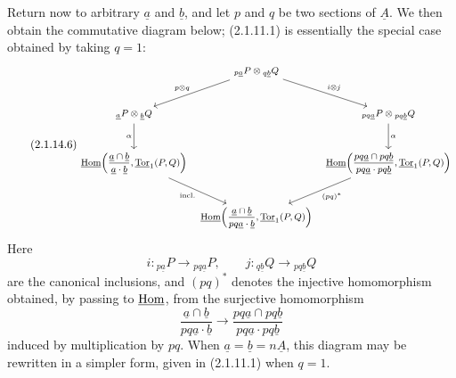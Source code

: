 Return now to arbitrary $\underline a$ and $\underline b$, and let
$p$ and $q$ be two sections of $\underline A$.  We then obtain the
commutative diagram below; (2.1.11.1) is essentially the special case
obtained by taking $q=1$:
\begin{equation}\tag{2.1.14.6}
{\footnotesize
\begin{tikzcd}[row sep=large,column sep=tiny]
 &{}_{p\underline a}P\otimes{}_{q\underline b}Q
   \arrow[dl,"p\otimes q"']
   \arrow[dr,"i\otimes j"]&\\
 {}_{\underline a}P\otimes{}_{\underline b}Q
   \arrow[d,"\alpha"']&&
 {}_{pq\underline a}P\otimes{}_{pq\underline b}Q
   \arrow[d,"\alpha"]\\
 \uHom\!\left(
   \dfrac{\underline a\cap\underline b}
         {\underline a\mathbin{\cdot}\underline b},
   \uTor_1(P,Q)
 \right)
   \arrow[dr,"\mathrm{incl.}"']&&
 \uHom\!\left(
   \dfrac{pq\underline a\cap pq\underline b}
         {pq\underline a\mathbin{\cdot}pq\underline b},
   \uTor_1(P,Q)
 \right)
   \arrow[dl,"(pq)^*"]\\
 &\uHom\!\left(
   \dfrac{\underline a\cap\underline b}
         {pq\underline a\mathbin{\cdot}\underline b},
   \uTor_1(P,Q)
 \right)&
\end{tikzcd}}
\end{equation}
Here
\[
 i:{}_{p\underline a}P\longrightarrow{}_{pq\underline a}P,
 \qquad
 j:{}_{q\underline b}Q\longrightarrow{}_{pq\underline b}Q
\]
are the canonical inclusions, and $(pq)^*$ denotes the injective
homomorphism obtained, by passing to $\uHom$, from the surjective
homomorphism
\[
 \frac{\underline a\cap\underline b}
      {pq\underline a\mathbin{\cdot}\underline b}
 \longrightarrow
 \frac{pq\underline a\cap pq\underline b}
      {pq\underline a\mathbin{\cdot}pq\underline b}
\]
induced by multiplication by $pq$.  When
$\underline a=\underline b=n\underline A$, this diagram may be
rewritten in a simpler form, given in (2.1.11.1) when $q=1$.
